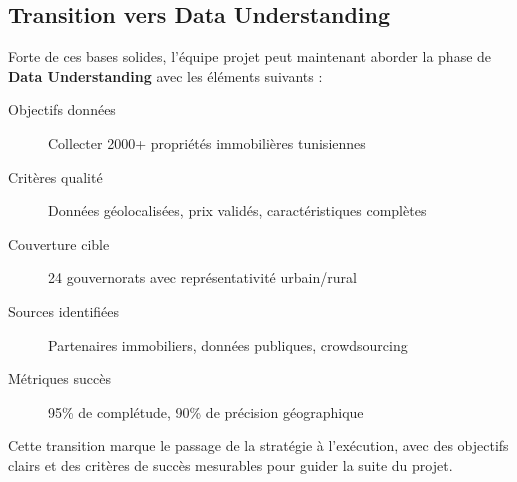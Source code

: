 \subsection{Transition vers Data Understanding}
\label{subsec:transition_data}

Forte de ces bases solides, l'équipe projet peut maintenant aborder la phase de \textbf{Data Understanding} avec les éléments suivants :

\begin{description}
    \item[Objectifs données] Collecter 2000+ propriétés immobilières tunisiennes
    \item[Critères qualité] Données géolocalisées, prix validés, caractéristiques complètes
    \item[Couverture cible] 24 gouvernorats avec représentativité urbain/rural
    \item[Sources identifiées] Partenaires immobiliers, données publiques, crowdsourcing
    \item[Métriques succès] 95\% de complétude, 90\% de précision géographique
\end{description}

Cette transition marque le passage de la stratégie à l'exécution, avec des objectifs clairs et des critères de succès mesurables pour guider la suite du projet.
